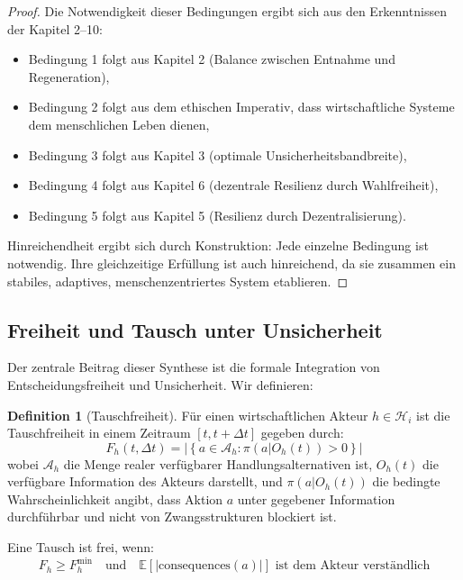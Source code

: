 \documentclass[a4paper, 12pt, twoside, openright]{report}
\theoremstyle{definition}
\newtheorem{definition}[theorem]{Definition}
\theoremstyle{definition}
\begin{document}
\begin{proof}
Die Notwendigkeit dieser Bedingungen ergibt sich aus den Erkenntnissen der Kapitel 2--10:

\begin{itemize}
\item Bedingung 1 folgt aus Kapitel 2 (Balance zwischen Entnahme und Regeneration),
\item Bedingung 2 folgt aus dem ethischen Imperativ, dass wirtschaftliche Systeme dem menschlichen Leben dienen,
\item Bedingung 3 folgt aus Kapitel 3 (optimale Unsicherheitsbandbreite),
\item Bedingung 4 folgt aus Kapitel 6 (dezentrale Resilienz durch Wahlfreiheit),
\item Bedingung 5 folgt aus Kapitel 5 (Resilienz durch Dezentralisierung).
\end{itemize}

Hinreichendheit ergibt sich durch Konstruktion: Jede einzelne Bedingung ist notwendig. Ihre gleichzeitige Erfüllung ist auch hinreichend, da sie zusammen ein stabiles, adaptives, menschenzentriertes System etablieren.
\end{proof}

\subsection{Freiheit und Tausch unter Unsicherheit}

Der zentrale Beitrag dieser Synthese ist die formale Integration von Entscheidungsfreiheit und Unsicherheit. Wir definieren:

\begin{definition}[Tauschfreiheit]
\label{def:tauschfreiheit}
Für einen wirtschaftlichen Akteur $h \in \mathcal{H}_i$ ist die Tauschfreiheit in einem Zeitraum $[t, t+\Delta t]$ gegeben durch:
\begin{equation}
F_h(t, \Delta t) = \left| \left\{ a \in \mathcal{A}_h : \pi(a|O_h(t)) > 0 \right\} \right|
\end{equation}
wobei $\mathcal{A}_h$ die Menge realer verfügbarer Handlungsalternativen ist, $O_h(t)$ die verfügbare Information des Akteurs darstellt, und $\pi(a|O_h(t))$ die bedingte Wahrscheinlichkeit angibt, dass Aktion $a$ unter gegebener Information durchführbar und nicht von Zwangsstrukturen blockiert ist.

Eine Tausch ist frei, wenn:
\begin{equation}
F_h \geq F_h^{\min} \quad \text{und} \quad \mathbb{E}[|\text{consequences}(a)|] \text{ ist dem Akteur verständlich}
\end{equation}
\end{definition}
\end{document}

